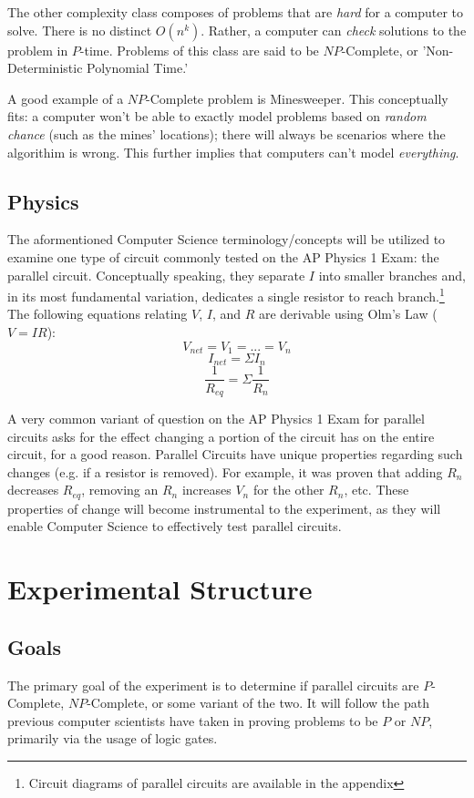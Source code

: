 \documentclass{article}
\begin{document}
The other complexity class composes of problems that are \textit{hard} for a computer to solve. There is no distinct $O(n^{k})$. Rather, a computer can \textit{check} solutions to the problem in $P$-time. Problems of this class are said to be $NP$-Complete, or 'Non-Deterministic Polynomial Time.' %

A good example of a $NP$-Complete problem is Minesweeper. This conceptually fits: a computer won't be able to exactly model problems based on \textit{random chance} (such as the mines' locations); there will always be scenarios where the algorithim is wrong.\cite{mine} This further implies that computers can't model \textit{everything}. 
\subsection{Physics}
The aformentioned Computer Science terminology/concepts will be utilized to examine one type of circuit commonly tested on the AP Physics 1 Exam: the parallel circuit.\cite{college} Conceptually speaking, they separate $I$ into smaller branches and, in its most fundamental variation, dedicates a single resistor to reach branch.\footnote{Circuit diagrams of parallel circuits are available in the appendix}%
 The following equations relating $V$, $I$, and $R$ are derivable using Olm's Law ($V=IR$): %
$$V_{net}=V_{1}=...=V_{n}$$
$$I_{net}= \Sigma I_{n}$$
$$\frac{1}{R_{eq}} = \Sigma \frac{1}{R_{n}}$$

A very common variant of question on the AP Physics 1 Exam for parallel circuits asks for the effect changing a portion of the circuit has on the entire circuit, for a good reason. Parallel Circuits have unique properties regarding such changes (e.g. if a resistor is removed). For example, it was proven that adding $R_{n}$ decreases $R_{eq}$, removing an $R_{n}$ increases $V_{n}$ for the other $R_{n}$, etc. %
These properties of change will become instrumental to the experiment, as they will enable Computer Science to effectively test parallel circuits.
\section{Experimental Structure}
\subsection{Goals}
The primary goal of the experiment is to determine if parallel circuits are $P$-Complete, $NP$-Complete, or some variant of the two. It will follow the path previous computer scientists have taken in proving problems to be $P$ or $NP$\cite{mine}, primarily via the usage of logic gates. 
\end{document}
